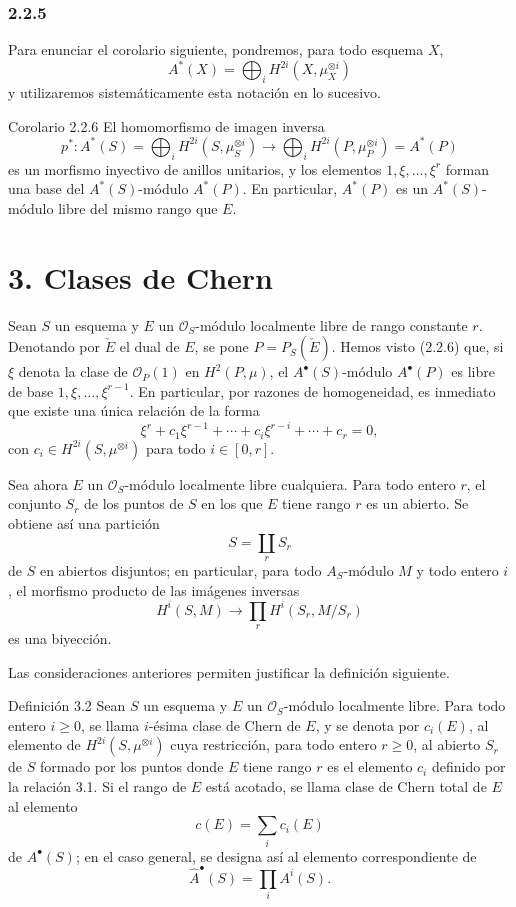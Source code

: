 \subsubsection*{2.2.5}
Para enunciar el corolario siguiente, pondremos, para todo esquema $X$,
\[
A^*(X)=\bigoplus_i H^{2i}(X,\mu_X^{\otimes i})
\]
y utilizaremos sistemáticamente esta notación en lo sucesivo.

\begin{statement}{Corolario 2.2.6}
El homomorfismo de imagen inversa
\[
p^*:A^*(S)=\bigoplus_i H^{2i}(S,\mu_S^{\otimes i})
\longrightarrow
\bigoplus_i H^{2i}(P,\mu_P^{\otimes i})=A^*(P)
\]
es un morfismo inyectivo de anillos unitarios, y los elementos $1,\xi,\ldots,\xi^r$ forman una base del $A^*(S)$-módulo $A^*(P)$. En particular, $A^*(P)$ es un $A^*(S)$-módulo libre del mismo rango que $E$.
\end{statement}

\section*{3. Clases de Chern}

Sean $S$ un esquema y $E$ un $\mathcal O_S$-módulo localmente libre de rango constante $r$. Denotando por $\check E$ el dual de $E$, se pone $P=P_S(\check E)$. Hemos visto (2.2.6) que, si $\xi$ denota la clase de $\mathcal O_P(1)$ en $H^2(P,\mu)$, el $A^\bullet(S)$-módulo $A^\bullet(P)$ es libre de base $1,\xi,\ldots,\xi^{r-1}$. En particular, por razones de homogeneidad, es inmediato que existe una única relación de la forma
\[
\xi^r+c_1\xi^{r-1}+\cdots+c_i\xi^{r-i}+\cdots+c_r=0,
\tag{3.1}
\]
con $c_i\in H^{2i}(S,\mu^{\otimes i})$ para todo $i\in[0,r]$.

Sea ahora $E$ un $\mathcal O_S$-módulo localmente libre cualquiera. Para todo entero $r$, el conjunto $S_r$ de los puntos de $S$ en los que $E$ tiene rango $r$ es un abierto. Se obtiene así una partición
\[
S=\coprod_r S_r
\]
de $S$ en abiertos disjuntos; en particular, para todo $A_S$-módulo $M$ y todo entero $i$, el morfismo producto de las imágenes inversas
\[
H^i(S,M)\longrightarrow \prod_r H^i(S_r,M/S_r)
\]
es una biyección.

Las consideraciones anteriores permiten justificar la definición siguiente.

\begin{statement}{Definición 3.2}
Sean $S$ un esquema y $E$ un $\mathcal O_S$-módulo localmente libre. Para todo entero $i\ge0$, se llama $i$-ésima clase de Chern de $E$, y se denota por $c_i(E)$, al elemento de $H^{2i}(S,\mu^{\otimes i})$ cuya restricción, para todo entero $r\ge0$, al abierto $S_r$ de $S$ formado por los puntos donde $E$ tiene rango $r$ es el elemento $c_i$ definido por la relación 3.1. Si el rango de $E$ está acotado, se llama clase de Chern total de $E$ al elemento
\[
c(E)=\sum_i c_i(E)
\]
de $A^\bullet(S)$; en el caso general, se designa así al elemento correspondiente de
\[
\widehat A^{\bullet}(S)=\prod_i A^i(S).
\]
\end{statement}
